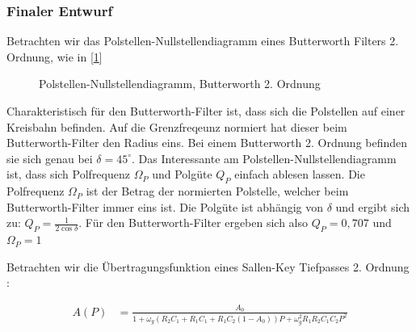 \subsubsection{Finaler Entwurf}



Betrachten wir das Polstellen-Nullstellendiagramm eines Butterworth Filters 2. Ordnung, wie in [\cref{fig:filter_polnul}]


\begin{figure}[H]
\centering
{}
\caption{Polstellen-Nullstellendiagramm, Butterworth 2. Ordnung}
\label{fig:filter_polnul}
\end{figure}



Charakteristisch für den Butterworth-Filter ist, dass sich die Polstellen auf einer Kreisbahn befinden. Auf die Grenzfreqeunz normiert hat dieser beim Butterworth-Filter den Radius
eins. Bei einem Butterworth 2. Ordnung befinden sie sich genau bei $\delta=45^\circ$. Das Interessante am Polstellen-Nullstellendiagramm ist, dass sich Polfrequenz $\Omega_P$ und 
Polgüte $Q_P$ einfach ablesen lassen. Die Polfrequenz $\Omega_P$ ist der Betrag der normierten Polstelle, welcher beim Butterworth-Filter immer eins ist.
Die Polgüte ist abhängig von $\delta$ und ergibt sich zu: $Q_P=\frac{1}{2\cos{\delta}}$. Für den Butterworth-Filter ergeben sich also $Q_P=0,707$ und $\Omega_P=1$

Betrachten wir die Übertragungsfunktion eines Sallen-Key Tiefpasses 2. Ordnung \cite[S. 101]{Krucker2000}:

\begin{align*}
A(P)&=\frac{A_0}{1+\omega_g (R_2 C_1 + R_1 C_1 + R_1 C_2(1-A_0))P + \omega_g^2R_1 R_2 C_1C_2P^2}
\end{align*}

